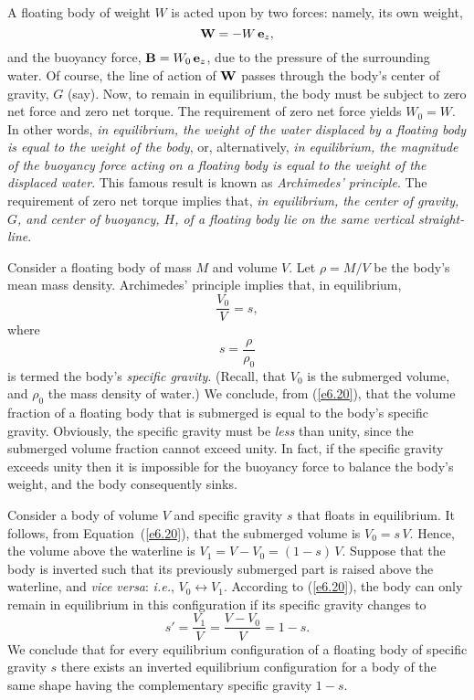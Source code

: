 A floating body of weight $W$ is acted upon by two forces: namely, its own weight, 
\begin{equation}
{\bf W} =- W\,{\bf e}_z,
\end{equation}
and the buoyancy force, ${\bf B}=W_0\,{\bf e}_z$,  due to the pressure of the surrounding water.
Of course, the line of action of ${\bf W}$ passes through the body's center of gravity, $G$ (say).
Now,   to remain in equilibrium, the body must be subject to zero net force and zero net torque. 
The  requirement of zero net force yields  $W_0=W$. In other words, {\em in equilibrium,  the weight of the water displaced by a floating body 
 is equal to the weight of the body}, or, alternatively, {\em in equilibrium, the magnitude of the buoyancy force acting on a floating body  is equal to the weight of the
displaced water}. This famous result is known as {\em Archimedes' principle}. The requirement of
zero net torque implies that, {\em in equilibrium, the center of gravity, $G$, and center of buoyancy, $H$, of
a floating body lie on the same vertical straight-line}.

Consider a floating body of mass $M$ and volume $V$. 
 Let $\rho = M/V$ be the body's
mean mass density. Archimedes' principle implies that, in equilibrium, 
\begin{equation}\label{e6.20}
\frac{V_0}{V} = s,
\end{equation}
where
\begin{equation}
s = \frac{\rho}{\rho_0}
\end{equation}
is termed the body's {\em specific gravity}. (Recall, that $V_0$ is the submerged volume, and $\rho_0$ the
mass density of water.)
We conclude, from (\ref{e6.20}), that the  volume fraction of a floating body  that is submerged  is equal to the body's 
specific gravity. Obviously, the specific gravity must be {\em less}\/ than unity, since the
submerged volume fraction cannot exceed unity.
In fact, if the specific gravity exceeds unity then it is impossible for the buoyancy force to balance the body's weight, and the body
consequently sinks. 

Consider a body of volume $V$ and specific gravity $s$ that floats in equilibrium. It follows, from Equation~(\ref{e6.20}),
that the submerged volume is $V_0=s\,V$. Hence, the volume above the waterline is $V_1= V-V_0 = (1-s)\,V$.
Suppose that the body is inverted such that its previously submerged part is raised above the waterline, and {\em vice versa}: {\em i.e.},
$V_0\leftrightarrow V_1$. According to (\ref{e6.20}),  the body can only remain in equilibrium in this configuration if its specific gravity changes to
\begin{equation}
s' = \frac{V_1}{V}=\frac{V-V_0}{V} =1-s.
\end{equation}
We conclude that for every equilibrium configuration of a floating body of specific gravity $s$ there exists
an inverted equilibrium configuration for a body of the same shape having the complementary
specific gravity $1-s$. 

